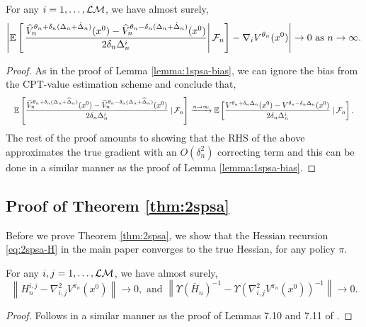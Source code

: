 \begin{lemma}
\label{lemma:2spsa-grad}
For any $i = 1,\ldots,\mathcal{L}\mathcal{M}$, we have almost surely,  
\begin{align}
\left| \mathbb{E}\left[\left.\dfrac{\widehat V_n^{\theta_n + \delta_n (\Delta_n + \hat \Delta_n)}(x^0) -\widehat V_n^{\theta_n - \delta_n (\Delta_n + \hat \Delta_n)}(x^0)}{2 \delta_n \Delta_n^i}\right| \mathcal{F}_n \right] - \nabla_i V^{\theta_n}(x^0) \right| \rightarrow 0 \text{ as } n\rightarrow\infty.
\end{align} 
\end{lemma}
\begin{proof}
As in the proof of Lemma \ref{lemma:1spsa-bias}, we can ignore the bias from the CPT-value estimation scheme and conclude that,
\begin{align*}
\quad&\mathbb{E}\left[\dfrac{\widehat V_n^{\theta_n + \delta_n (\Delta_n+\widehat\Delta_n)}(x^0) -\widehat V_n^{\theta_n - \delta_n (\Delta_n+\widehat\Delta_n)}(x^0)}{2 \delta_n \Delta_n^i} \left.\right| \mathcal{F}_n\right] 
\xrightarrow{n\rightarrow\infty}  \mathbb{E}\left[\dfrac{V^{\theta_n + \delta_n \Delta_n}(x^0) -V^{\theta_n - \delta_n \Delta_n}(x^0)}{2 \delta_n \Delta_n^i} \left.\right| \mathcal{F}_n\right].  
\end{align*}
The rest of the proof amounts to showing that the RHS of the above approximates the true gradient with an $O(\delta_n^2)$ correcting term and this can be done in a similar manner as the proof of Lemma \ref{lemma:1spsa-bias}.
\end{proof}

\subsection*{Proof of Theorem \ref{thm:2spsa}}

Before we prove Theorem \ref{thm:2spsa}, we show that the Hessian recursion \eqref{eq:2spsa-H} in the main paper converges to the true Hessian, for any policy $\pi$.

\begin{lemma}
\label{lemma:h-est}
For any $i, j= 1,\ldots,\mathcal{L}\mathcal{M}$, we have almost surely,  
$$\left \| H^{i, j}_n - \nabla^2_{i,j} V^{\pi_n}(x^0) \right \| \rightarrow 0,
\text{ and }\left \| \Upsilon(\overline H_n)^{-1} - \Upsilon(\nabla^2_{i,j} V^{\pi_n}(x^0))^{-1} \right \| \rightarrow 0.
$$
\end{lemma}
\begin{proof}
 Follows in a similar manner as the proof of Lemmas 7.10 and 7.11 of \cite{Bhatnagar13SR}.
\end{proof}

